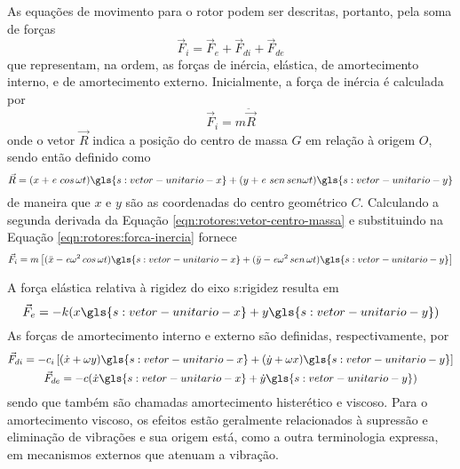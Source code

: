 \documentclass[12pt,openright,oneside,a4paper,
	chapter=TITLE,section=TITLE,
	english,brazil]{abntex2}
\begin{document}
	As equações de movimento para o rotor podem ser descritas, portanto, pela soma de forças \cite{rao:2008}
	\begin{equation} \label{eqn:rotores:forcas}
		\vec{F}_i = \vec{F}_e + \vec{F}_{di} + \vec{F}_{de}
	\end{equation}
	que representam, na ordem, as forças de inércia, elástica, de amortecimento interno, e de amortecimento externo. Inicialmente, a força de inércia é calculada por \cite{rao:2008}
	\begin{equation} \label{eqn:rotores:forca-inercia}
		\vec{F}_i = m\ddot{\vec{R}}
	\end{equation}
	onde o vetor $ \vec{R} $ indica a posição do centro de massa $ \mathit{G} $ em relação à origem $ \mathit{O} $, sendo então definido como \cite{rao:2008}
	\begin{equation} \label{eqn:rotores:vetor-centro-massa}
		\vec{R} = (x + \mathit{e}\ cos\,\omega t)\gls{s:vetor-unitario-x} + (y + \mathit{e}\ sen\,sen\omega t)\gls{s:vetor-unitario-y}
	\end{equation}
	de maneira que $ x $ e $ y $ são as coordenadas do centro geométrico $ \mathit{C} $. Calculando a segunda derivada da Equação \ref{eqn:rotores:vetor-centro-massa} e substituindo na Equação \ref{eqn:rotores:forca-inercia} fornece
	\begin{equation} \label{eqn:rotres:forca-inercia}
		\vec{F}_i = m\left[ (\ddot{x} - \mathit{e}\omega^2\,cos\,\omega t)\gls{s:vetor-unitario-x} +
		(\ddot{y} - \mathit{e}\omega^2\,sen\,\omega t)\gls{s:vetor-unitario-y} \right]
	\end{equation}
	
	A força elástica relativa à rigidez do eixo \gls{s:rigidez} resulta em \cite{rao:2008}
	\begin{equation}\label{eqn:rotores:forca-elastica}
		\vec{F}_e = -k(x\gls{s:vetor-unitario-x} + y\gls{s:vetor-unitario-y})
	\end{equation}
	As forças de amortecimento interno e externo são definidas, respectivamente, por \cite{rao:2008}
	\begin{gather}
		\vec{F}_{di} = -c_i\left[(\dot{x} + \omega y)\gls{s:vetor-unitario-x} +
		(\dot{y} + \omega x)\gls{s:vetor-unitario-y} \right] \label{eqn:rotores:forca-amort-interno} \\
		\vec{F}_{de} = -c(\dot{x}\gls{s:vetor-unitario-x} + \dot{y}\gls{s:vetor-unitario-y}) \label{eqn:rotores:forca-amort-externo}
	\end{gather}
	sendo que também são chamadas amortecimento histerético e viscoso. Para o amortecimento viscoso, os efeitos estão geralmente relacionados à supressão e eliminação de vibrações \cite{dimarogonas:1995} e sua origem está, como a outra terminologia expressa, em mecanismos externos que atenuam a vibração.
	
\end{document}
